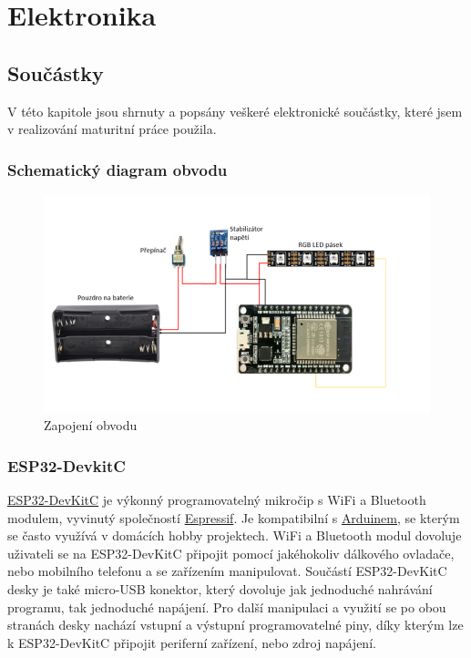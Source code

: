 \chapter{Elektronika}

\section{Součástky}
V této kapitole jsou shrnuty a popsány veškeré elektronické součástky, které jsem v realizování maturitní práce použila.

\subsection{Schematický diagram obvodu}

\begin{figure}[htbp]
	\centering
	\includegraphics[width=1\textwidth]{img/01 uvod/RGB Schema.png}
	\caption{Zapojení obvodu}
\end{figure}

\subsection{ESP32-DevkitC}
\href{https://www.espressif.com/sites/default/files/documentation/esp32_datasheet_en.pdf}{ESP32-DevKitC} je výkonný programovatelný mikročip s WiFi a Bluetooth modulem, vyvinutý společností \href{https://www.espressif.com}{Espressif}. Je kompatibilní s \href{https://www.arduino.cc}{Arduinem}, se kterým se často využívá v domácích hobby projektech. WiFi a Bluetooth modul dovoluje uživateli se na ESP32-DevKitC připojit pomocí jakéhokoliv dálkového ovladače, nebo mobilního telefonu a se zařízením manipulovat.
Součástí ESP32-DevKitC desky je také micro-USB konektor, který dovoluje jak jednoduché nahrávání programu, tak jednoduché napájení. Pro další manipulaci a využití se po obou stranách desky nachází vstupní a výstupní programovatelné piny, díky kterým lze k ESP32-DevKitC připojit periferní zařízení, nebo zdroj napájení.

